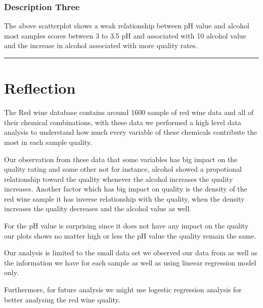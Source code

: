 \documentclass[]{article}
\begin{document}
\hypertarget{description-three}{%
\subsubsection{Description Three}\label{description-three}}

The above scatterplot shows a weak relationship between pH value and
alcohol most samples scores between 3 to 3.5 pH and associated with 10
alcohol value and the increase in alcohol associated with more quality
rates.

\begin{center}\rule{0.5\linewidth}{\linethickness}\end{center}

\hypertarget{reflection}{%
\section{Reflection}\label{reflection}}

The Red wine database contains around 1600 sample of red wine data and
all of their chemical combinations, with these data we performed a high
level data analysis to understand how much every variable of these
chemicals contribute the most in each sample quality.

Our observation from these data that some variables has big impact on
the quality rating and some other not for instance, alcohol showed a
propotional relationship toward the quality whenever the alcohol
increases the quality increases. Another factor which has big impact on
quality is the density of the red wine sample it has inverse
relationship with the quality, when the density increases the quality
decreases and the alcohol value as well.

For the pH value is surprising since it does not have any impact on the
quality our plots shows no matter high or less the pH value the quality
remain the same.

Our analysis is limited to the small data set we observed our data from
as well as the information we have for each sample as well as using
lineear regression model only.

Furthermore, for future analysis we might use logestic regression
analysis for better analysing the red wine quality.
\end{document}
